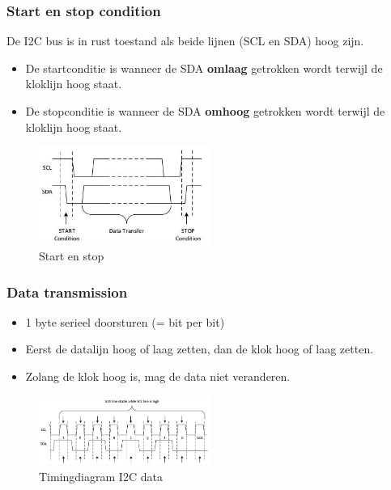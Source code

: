 \documentclass{article}
\newcommand{\bold}[1]{\textbf{#1}}
\begin{document}
\subsubsection{Start en stop condition}
De I2C bus is in rust toestand als beide lijnen (SCL en SDA) hoog zijn.

\begin{itemize}
    \item De startconditie is wanneer de SDA \bold{omlaag} getrokken wordt terwijl de kloklijn hoog staat.
    \item De stopconditie is wanneer de SDA \bold{omhoog} getrokken wordt terwijl de kloklijn hoog staat.
\end{itemize}

\begin{figure}[H]
    \centering
    \includegraphics[width=0.5\textwidth]{i2c-start-stop.png}
    \caption{Start en stop}
\end{figure}

\subsubsection{Data transmission}
\begin{itemize}
    \item 1 byte serieel doorsturen (= bit per bit)
    \item Eerst de datalijn hoog of laag zetten, dan de klok hoog of laag zetten. 
    \item Zolang de klok hoog is, mag de data niet veranderen.
\end{itemize}

\begin{figure}[H]
    \centering
    \includegraphics[width=0.5\textwidth]{i2c-timing.png}
    \caption{Timingdiagram I2C data}
\end{figure}
\end{document}
